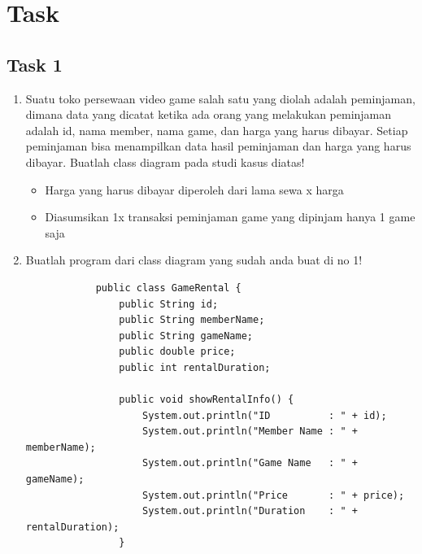 \documentclass[12pt,titlepage]{article}
\begin{document}
\section{Task}
\subsection{Task 1}
\begin{enumerate}
    \item {
        Suatu toko persewaan video game salah satu yang diolah adalah peminjaman, dimana
        data yang dicatat ketika ada orang yang melakukan peminjaman adalah id, nama
        member, nama game, dan harga yang harus dibayar. Setiap peminjaman bisa
        menampilkan data hasil peminjaman dan harga yang harus dibayar. Buatlah class
        diagram pada studi kasus diatas!

        \begin{itemize}
            \item Harga yang harus dibayar diperoleh dari lama sewa x harga
            \item Diasumsikan 1x transaksi peminjaman game yang dipinjam hanya 1 game saja
        \end{itemize}

    }
    \item {
        Buatlah program dari class diagram yang sudah anda buat di no 1!

        \begin{verbatim}
            public class GameRental {
                public String id;
                public String memberName;
                public String gameName;
                public double price;
                public int rentalDuration;

                public void showRentalInfo() {
                    System.out.println("ID          : " + id);
                    System.out.println("Member Name : " + memberName);
                    System.out.println("Game Name   : " + gameName);
                    System.out.println("Price       : " + price);
                    System.out.println("Duration    : " + rentalDuration);
                }


\end{verbatim}}
\end{enumerate}
\end{document}
